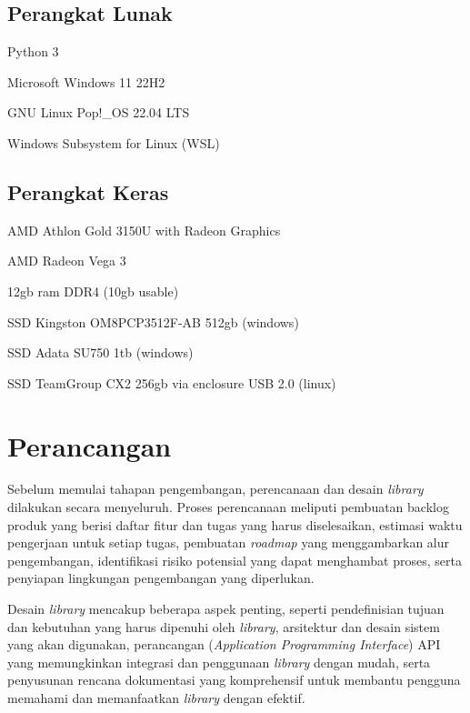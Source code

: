 \subsection{Perangkat Lunak}
\begin{packed_enum}
  \item Python 3
  \item Microsoft Windows 11 22H2
  \item GNU Linux Pop!\_OS 22.04 LTS
  \item Windows Subsystem for Linux (WSL)
\end{packed_enum}

\subsection{Perangkat Keras}
\begin{packed_enum}
  \item AMD Athlon Gold 3150U with Radeon Graphics
  \item AMD Radeon Vega 3
  \item 12gb ram DDR4 (10gb usable)
  \item SSD Kingston OM8PCP3512F-AB 512gb (windows)
  \item SSD Adata SU750 1tb (windows)
  \item SSD TeamGroup CX2 256gb via enclosure USB 2.0 (linux)
\end{packed_enum}

\section{Perancangan}
Sebelum memulai tahapan pengembangan, perencanaan dan desain \textit{library} dilakukan secara menyeluruh. Proses perencanaan meliputi pembuatan backlog produk yang berisi daftar fitur dan tugas yang harus diselesaikan, estimasi waktu pengerjaan untuk setiap tugas, pembuatan \textit{roadmap} yang menggambarkan alur pengembangan, identifikasi risiko potensial yang dapat menghambat proses, serta penyiapan lingkungan pengembangan yang diperlukan.

Desain \textit{library} mencakup beberapa aspek penting, seperti pendefinisian tujuan dan kebutuhan yang harus dipenuhi oleh \textit{library}, arsitektur dan desain sistem yang akan digunakan, perancangan (\textit{Application Programming Interface}) API yang memungkinkan integrasi dan penggunaan \textit{library} dengan mudah, serta penyusunan rencana dokumentasi yang komprehensif untuk membantu pengguna memahami dan memanfaatkan \textit{library} dengan efektif.

